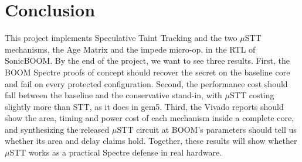 \section{Conclusion}
\label{sec:conclusion}


This project implements Speculative Taint Tracking and the two $\mu$STT mechanisms,
the Age Matrix and the impede micro-op, in the RTL of SonicBOOM.
By the end of the project, we want to see three results.
First, the BOOM Spectre proofs of concept should recover the secret on the baseline
core and fail on every protected configuration. Second, the performance cost should fall
between the baseline and the conservative stand-in, with $\mu$STT costing slightly
more than STT, as it does in gem5. Third, the Vivado reports should show the area, timing and power
cost of each mechanism inside a complete core, and synthesizing the released $\mu$STT
circuit at BOOM's parameters should tell us whether its area and delay claims hold.
Together, these results will show whether $\mu$STT works as a practical Spectre
defense in real hardware.
